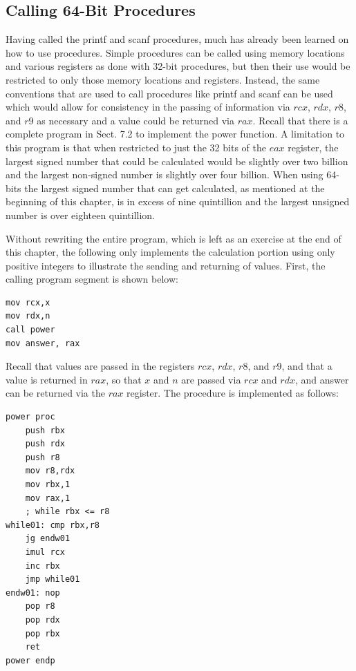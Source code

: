 \documentclass[10pt]{book}
\begin{document}
\subsection{Calling 64-Bit Procedures}
Having called the printf and scanf procedures, much has already been learned on how to use procedures. Simple procedures can be called using memory locations and various registers as done with 32-bit procedures, but then their use would be restricted to only those memory locations and registers. Instead, the same conventions that are used to call procedures like printf and scanf can be used which would allow for consistency in the passing of information via $rcx$, $rdx$, $r8$, and $r9$ as necessary and a value could be returned via $rax$.
Recall that there is a complete program in Sect. 7.2 to implement the power function. A limitation to this program is that when restricted to just the 32 bits of the $eax$ register, the largest signed number that could be calculated would be slightly over two billion and the largest non-signed number is slightly over four billion. When using 64-bits the largest signed number that can get calculated, as mentioned at the beginning of this chapter, is in excess of nine quintillion and the largest unsigned number is over eighteen quintillion.

Without rewriting the entire program, which is left as an exercise at the end of this chapter, the following only implements the calculation portion using only positive integers to illustrate the sending and returning of values. First, the calling program segment is shown below:

\begin{verbatim}
mov rcx,x
mov rdx,n
call power
mov answer, rax
\end{verbatim}

Recall that values are passed in the registers $rcx$, $rdx$, $r8$, and $r9$, and that a value is returned in $rax$, so that $x$ and $n$ are passed via $rcx$ and $rdx$, and answer can be returned via the $rax$ register. The procedure is implemented as follows:

\begin{verbatim}
power proc
    push rbx
    push rdx
    push r8
    mov r8,rdx
    mov rbx,1
    mov rax,1
    ; while rbx <= r8
while01: cmp rbx,r8
    jg endw01
    imul rcx
    inc rbx
    jmp while01
endw01: nop
    pop r8
    pop rdx
    pop rbx
    ret
power endp
\end{verbatim}
\end{document}
